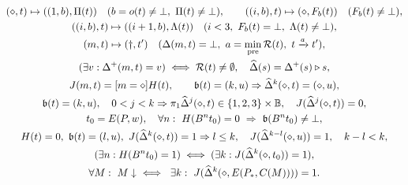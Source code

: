 \begin{gather}
(\diamond,t)\mapsto((1,b),\Pi(t))\quad(b=o(t)\ne\bot,\ \Pi(t)\ne\bot),\qquad
((i,b),t)\mapsto(\diamond,F_b(t))\quad (F_b(t)\ne\bot),\\
((i,b),t)\mapsto((i+1,b),\Lambda(t))\quad (i<3,\ F_b(t)=\bot,\ \Lambda(t)\ne\bot),\\
(m,t)\mapsto(\dagger,t')\quad (\Delta(m,t)=\bot,\ a=\min_{\rm pre}\mathcal R(t),\ t\xrightarrow a t'),\\
(\exists v:\Delta^+(m,t)=v)\iff\mathcal R(t)\ne\emptyset,\quad
\widehat\Delta(s)=\Delta^+(s)\triangleright s,\\
J(m,t)=[m=\diamond]H(t),\qquad
\mathfrak b(t)=(k,u)\Rightarrow\widehat\Delta^k(\diamond,t)=(\diamond,u),\\
\mathfrak b(t)=(k,u),\quad 0<j<k
\Rightarrow\pi_1\widehat\Delta^j(\diamond,t)\in\{1,2,3\}\times\mathbb B,\quad
J(\widehat\Delta^j(\diamond,t))=0,\\
t_0=E(P,w),\quad \forall n:\ H(B^nt_0)=0\ \Rightarrow\ \mathfrak b(B^nt_0)\ne\bot,\\
H(t)=0,\ \mathfrak b(t)=(l,u),\ J(\widehat\Delta^k(\diamond,t))=1
\Rightarrow l\le k,\quad J(\widehat\Delta^{k-l}(\diamond,u))=1,\quad k-l<k,\\
(\exists n:H(B^nt_0)=1)\iff(\exists k:J(\widehat\Delta^k(\diamond,t_0))=1),\\
\forall M:\ M\downarrow\ \iff\ \exists k:\ J(\widehat\Delta^k(\diamond,E(P_*,C(M))))=1.
\end{gather}
